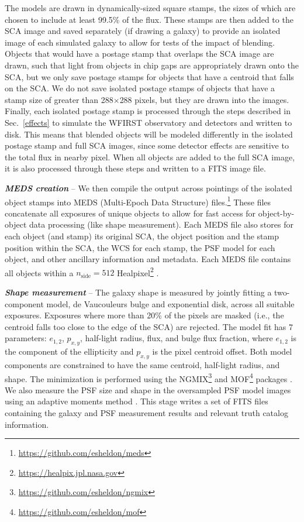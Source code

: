 \documentclass[usenatbib]{mnras}
\begin{document}
The models are drawn in dynamically-sized square stamps, the sizes of which are chosen to include at least 99.5\% of the flux.
These stamps are then added to the SCA image and saved separately (if drawing a galaxy) to provide an isolated image of each simulated galaxy to allow for tests of the impact of blending.
Objects that would have a postage stamp that overlaps the SCA image are drawn, such that light from objects in chip gaps are appropriately drawn onto the SCA, but we only save postage stamps for objects that have a centroid that falls on the SCA. 
We do not save isolated postage stamps of objects that have a stamp size of greater than 288$\times$288 pixels, but they are drawn into the images.
Finally, each isolated postage stamp is processed through the steps described in Sec.~\ref{effects} to simulate the WFIRST observatory and detectors and written to disk. This means that blended objects will be modeled differently in the isolated postage stamp and full SCA images, since some detector effects are sensitive to the total flux in nearby pixel. When all objects are added to the full SCA image, it is also processed through these steps and written to a FITS image file.

\textbf{\textit{MEDS creation}} -- We then compile the output across pointings of the isolated object stamps into MEDS (Multi-Epoch Data Structure) files.\footnote{\url{https://github.com/esheldon/meds}}
These files concatenate all exposures of unique objects to allow for fast access for object-by-object data processing (like shape measurement). 
Each MEDS file also stores for each object (and stamp) its original SCA, the object position and the stamp position within the SCA, the WCS for each stamp, the PSF model for each object, and other ancillary information and metadata.
Each MEDS file contains all objects within a $n_{\textrm{side}}=512$ Healpixel\footnote{\url{https://healpix.jpl.nasa.gov}} \citep{2005ApJ...622..759G,Zonca2019}.

\textbf{\textit{Shape measurement}} -- 
The galaxy shape is measured by jointly fitting a two-component model, de Vaucouleurs bulge and exponential disk, across all suitable exposures. 
Exposures where more than 20\% of the pixels are masked (i.e., the centroid falls too close to the edge of the SCA) are rejected. 
The model fit has 7 parameters: $e_{1,2}$, $p_{x,y}$, half-light radius, flux, and bulge flux fraction, where $e_{1,2}$ is the component of the ellipticity and $p_{x,y}$ is the pixel centroid offset. Both model components are constrained to have the same centroid, half-light radius, and shape.
The minimization is performed using the \textsc{NGMIX}\footnote{\url{https://github.com/esheldon/ngmix}} and \textsc{MOF}\footnote{\url{https://github.com/esheldon/mof}} packages \citep{2014MNRAS.444L..25S}. 
We also measure the PSF size and shape in the oversampled PSF model images using an adaptive moments method \citep{2003MNRAS.343..459H}. 
This stage writes a set of FITS files containing the galaxy and PSF measurement results and relevant truth catalog information.
\end{document}
